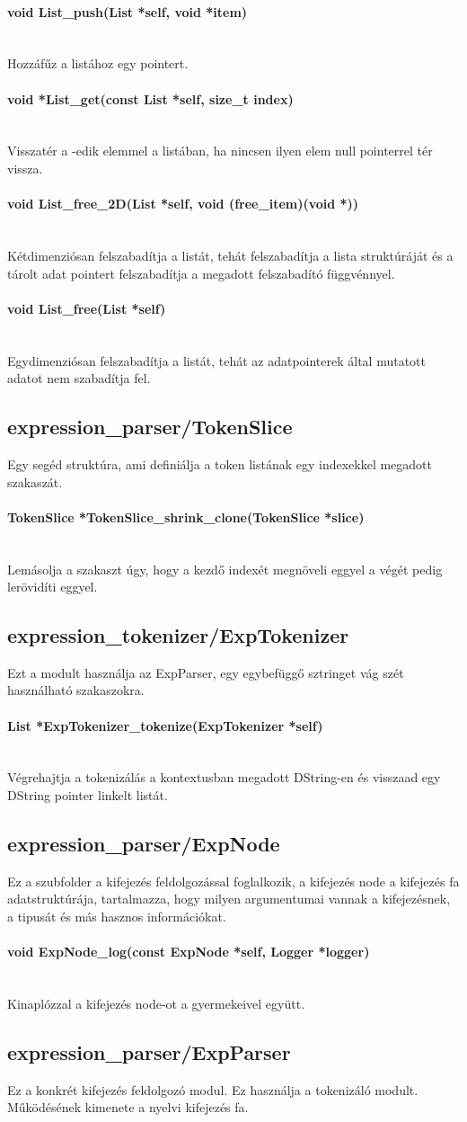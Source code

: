 \documentclass{article}[12pt,a4paper]
\newcommand{\fn}[1]{\paragraph{#1}\mbox{}\\}
\begin{document}
    \fn{void List\_push(List *self, void *item)}
    Hozzáfűz a listához egy pointert.

    \fn{void *List\_get(const List *self, size\_t index)}
    Visszatér a -edik elemmel a listában, ha nincsen ilyen elem null pointerrel tér vissza.

    \fn{void List\_free\_2D(List *self, void (free\_item)(void *))}
    Kétdimenziósan felszabadítja a listát, tehát felszabadítja a lista struktúráját és a tárolt adat pointert felszabadítja a megadott felszabadító függvénnyel.

    \fn{void List\_free(List *self)}
    Egydimenziósan felszabadítja a listát, tehát az adatpointerek által mutatott adatot nem szabadítja fel.

    \subsection{expression\_parser/TokenSlice}
    Egy segéd struktúra, ami definiálja a token listának egy indexekkel megadott szakaszát.

    \fn{TokenSlice *TokenSlice\_shrink\_clone(TokenSlice *slice)}
    Lemásolja a szakaszt úgy, hogy a kezdő indexét megnöveli eggyel a végét pedig lerövidíti eggyel.

    \subsection{expression\_tokenizer/ExpTokenizer}
    Ezt a modult használja az ExpParser, egy egybefüggő sztringet vág szét használható szakaszokra.

    \fn{List *ExpTokenizer\_tokenize(ExpTokenizer *self)}
    Végrehajtja a tokenizálás a kontextusban megadott DString-en és visszaad egy DString pointer linkelt listát.

    \subsection{expression\_parser/ExpNode}
    Ez a szubfolder a kifejezés feldolgozással foglalkozik, a kifejezés node a kifejezés fa adatstruktúrája, tartalmazza, hogy milyen argumentumai vannak a kifejezésnek, a tipusát és más hasznos információkat.

    \fn{void ExpNode\_log(const ExpNode *self, Logger *logger)}
    Kinaplózzal a kifejezés node-ot a gyermekeivel együtt.

    \subsection{expression\_parser/ExpParser}
    Ez a konkrét kifejezés feldolgozó modul.
    Ez használja a tokenizáló modult.
    Működésének kimenete a nyelvi kifejezés fa.
\end{document}
